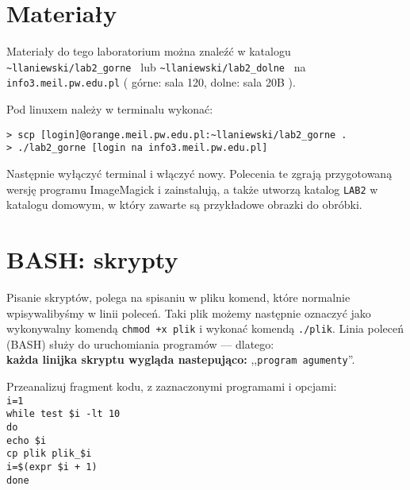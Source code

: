 \documentclass{instrukcja}
\begin{document}
\author{Ł. Łaniewski-Wołłk}
\materialtitle

\section{Materiały}

Materiały do tego laboratorium można znaleźć w katalogu {\tt \textasciitilde{}llaniewski/lab2\_gorne } lub  {\tt \textasciitilde{}llaniewski/lab2\_dolne }  na {\tt info3.meil.pw.edu.pl} ( górne: sala 120, dolne: sala 20B ). 

Pod linuxem należy w terminalu wykonać:
\begin{verbatim}
> scp [login]@orange.meil.pw.edu.pl:~llaniewski/lab2_gorne .
> ./lab2_gorne [login na info3.meil.pw.edu.pl]
\end{verbatim}
Następnie wyłączyć terminal i włączyć nowy. Polecenia te zgrają przygotowaną wersję programu ImageMagick i zainstalują, a także utworzą katalog {\tt LAB2} w katalogu domowym, w który zawarte są przykładowe obrazki do obróbki.

\section{BASH: skrypty}
Pisanie skryptów, polega na spisaniu w pliku komend, które normalnie wpisywalibyśmy w linii poleceń. Taki plik możemy następnie oznaczyć jako wykonywalny komendą {\tt chmod +x plik} i wykonać komendą {\tt ./plik}. Linia poleceń (BASH) służy do uruchomiania programów --- dlatego:\\{\bf każda linijka skryptu wygląda nastepująco:} ,,{\tt {\red program} {\green agumenty}}''.

Przeanalizuj fragment kodu, z zaznaczonymi {\red programami} i {\green opcjami}:
{\tt\\
{\red i=1}\\
while {\red test} {\green \$i -lt 10}\\
do\\
{\red echo} {\green \$i}\\
{\red cp} {\green plik plik\_\$i}\\
{\red i=}\$({\red expr} {\green \$i + 1})\\
done\\
}
\end{document}
